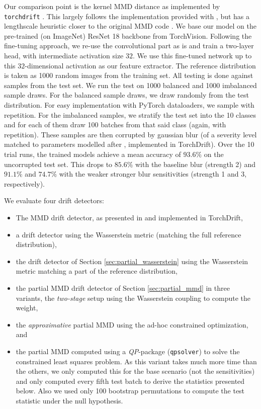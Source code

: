 \documentclass[a4paper,twoside,10pt]{article}
\theoremstyle{plain}
\theoremstyle{remark}
\begin{document}
Our comparison point is the kernel MMD distance as implemented by \texttt{torchdrift} \cite{torchdrift}. This largely follows the implementation provided with \cite{FailingLoudly}, but has a lengthscale heuristic closer to the original MMD code \cite{Gretton}.
We base our model on the pre-trained (on ImageNet) ResNet 18 backbone from TorchVision. Following the fine-tuning approach, we re-use the convolutional part as is and train a two-layer head, with intermediate activation size $32$.
We use this fine-tuned network up to this $32$-dimensional activation as our feature extractor. The reference distribution is taken as 1000 random images from the training set. All testing is done against samples from the test set. We run the test on 1000 balanced and 1000 imbalanced sample draws. For the balanced sample draws, we draw randomly from the test distribution. For easy implementation with PyTorch dataloaders, we sample with repetition. For the imbalanced samples, we stratify the test set into the 10 classes and for each of them draw 100 batches from that said class (again, with repetition). These samples are then corrupted by gaussian blur (of a severity level matched to parameters modelled after \cite{Hendrycks}, implemented in TorchDrift). Over the 10 trial runs, the trained models achieve a mean accuracy of $93.6\%$ on the uncorrupted test set. This drops to $85.6\%$ with the baseline blur (strength 2) and $91.1\%$ and $74.7\%$ with the weaker stronger blur sensitivities (strength 1 and 3, respectively).

We evaluate four drift detectors:
\begin{itemize}
\item The MMD drift detector, as presented in \cite{FailingLoudly} and implemented in TorchDrift,
\item a drift detector using the Wasserstein metric (matching the full reference distribution),
\item the drift detector of Section \ref{sec:partial_wasserstein} using the Wasserstein metric matching a part of the reference distribution,
\item the partial MMD drift detector of Section \ref{sec:partial_mmd} in three variants, the \textit{two-stage} setup using the Wasserstein coupling to compute the weight,
\item the \textit{approximative} partial MMD using the ad-hoc constrained optimization, and
\item the partial MMD computed using a \textit{QP}-package (\texttt{qpsolver}) to solve the constrained least squares problem. As this variant takes much more time than the others,
  we only computed this for the base scenario (not the sensitivities) and only computed every fifth test batch to derive the statistics presented below. Also we used only 100 bootstrap permutations to compute the test statistic under the null hypothesis.
\end{itemize}
\end{document}
